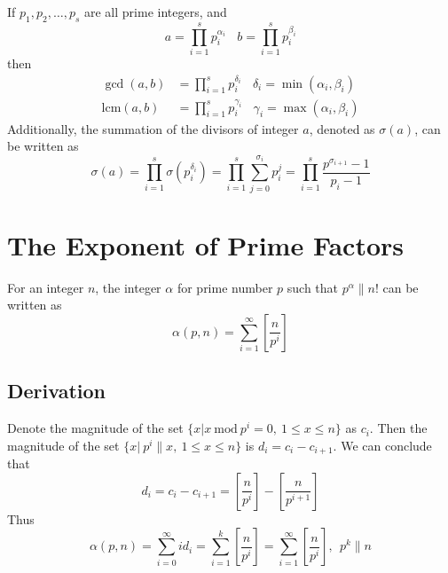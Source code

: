 \documentclass[11pt]{article}
\begin{document}
If $p_1, p_2, \dots, p_s$ are all prime integers, and
\begin{equation}
    a = \prod_{i=1}^s p_i^{\alpha_i}~~~~b = \prod_{i=1}^s p_i^{\beta_i}
\end{equation}
then
\begin{equation}
\begin{aligned}
    \gcd(a,b) &= \prod_{i=1}^s p_i^{\delta_i}~~~~\delta_i = \min(\alpha_i,\beta_i) \\
    \text{lcm}(a,b) &= \prod_{i=1}^s p_i^{\gamma_i}~~~~\gamma_i = \max(\alpha_i,\beta_i)
\end{aligned}
\end{equation}
Additionally, the summation of the divisors of integer $a$, denoted as  $\sigma(a)$, can be written as
\begin{equation}
    \sigma(a) = \prod_{i=1}^s \sigma(p_i^{\delta_i}) = \prod_{i=1}^s \sum_{j=0}^{\sigma_i} p_i^j = \prod_{i=1}^s \frac{p^{\sigma_{i+1}} - 1}{p_i - 1}
\end{equation}
\section{The Exponent of Prime Factors}
For an integer $n$, the integer $\alpha$ for prime number $p$ such that $p^{\alpha} \parallel n!$ can be written as
\begin{equation}
    \alpha(p,n) = \sum_{i=1}^{\infty} \left[\frac{n}{p^i}\right]
\end{equation}
\subsection{Derivation}
Denote the magnitude of the set $\{x | x~\text{mod}~p^i = 0,~1 \leq x \leq n\}$ as $c_i$. Then the magnitude of the set $\{x|~p^i \parallel x,~1\leq x \leq n\}$ is $d_i = c_{i} - c_{i+1}$. We can conclude that
\begin{equation}
    d_i = c_{i}-c_{i+1} = \left[\frac{n}{p^{i}}\right]  - \left[\frac{n}{p^{i+1}}\right]
\end{equation}
Thus
\begin{equation}
    \alpha(p,n) = \sum_{i=0}^{\infty}id_i = \sum_{i=1}^k \left[ \frac{n}{p^i}\right] = \sum_{i=1}^{\infty} \left[ \frac{n}{p^i}\right] ,~~p^k \parallel n
\end{equation}
\end{document}
